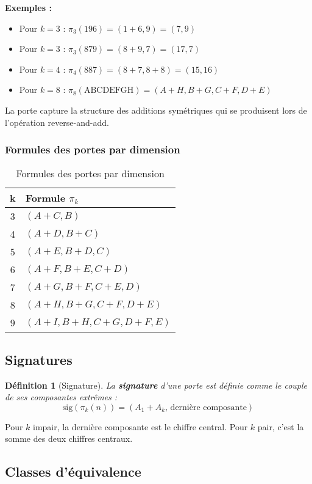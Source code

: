\documentclass[12pt,a4paper]{article}
\newtheorem{definition}{Définition}[section]
\theoremstyle{remark}
\begin{document}
\textbf{Exemples :}
\begin{itemize}
\item Pour $k=3$ : $\pi_3(196) = (1+6, 9) = (7, 9)$
\item Pour $k=3$ : $\pi_3(879) = (8+9, 7) = (17, 7)$
\item Pour $k=4$ : $\pi_4(887) = (8+7, 8+8) = (15, 16)$
\item Pour $k=8$ : $\pi_8(\text{ABCDEFGH}) = (A+H, B+G, C+F, D+E)$
\end{itemize}

La porte capture la structure des additions symétriques qui se produisent lors de l'opération reverse-and-add.

\subsubsection{Formules des portes par dimension}

\begin{table}[h]
\centering
\caption{Formules des portes par dimension}
\begin{tabular}{cl}
\toprule
\textbf{k} & \textbf{Formule $\pi_k$}\\
\midrule
3 & $(A+C, B)$\\
4 & $(A+D, B+C)$\\
5 & $(A+E, B+D, C)$\\
6 & $(A+F, B+E, C+D)$\\
7 & $(A+G, B+F, C+E, D)$\\
8 & $(A+H, B+G, C+F, D+E)$\\
9 & $(A+I, B+H, C+G, D+F, E)$\\
\bottomrule
\end{tabular}
\end{table}

\subsection{Signatures}

\begin{definition}[Signature]
La \textbf{signature} d'une porte est définie comme le couple de ses composantes extrêmes :
\[
\text{sig}(\pi_k(n)) = (A_1 + A_k, \, \text{dernière composante})
\]
\end{definition}

Pour $k$ impair, la dernière composante est le chiffre central. Pour $k$ pair, c'est la somme des deux chiffres centraux.

\subsection{Classes d'équivalence}
\end{document}
